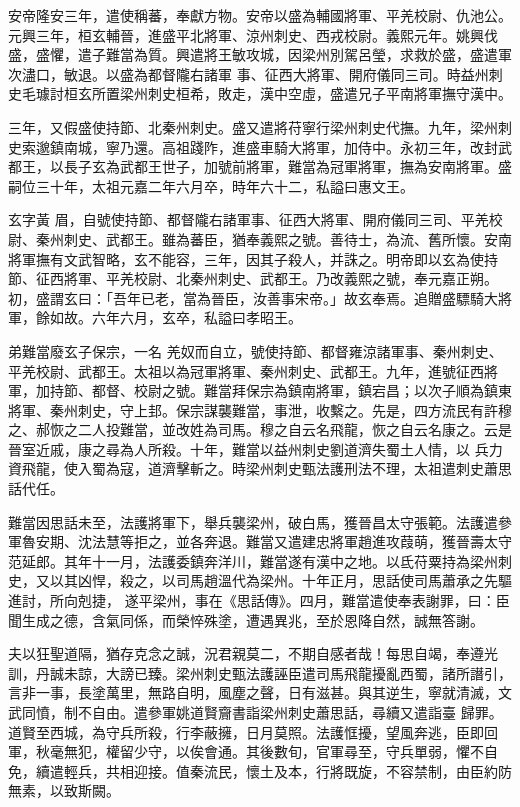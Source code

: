 \begin{pinyinscope}
 安帝隆安三年，遣使稱蕃，奉獻方物。安帝以盛為輔國將軍、平羌校尉、仇池公。元興三年，桓玄輔晉，進盛平北將軍、涼州刺史、西戎校尉。義熙元年。姚興伐盛，盛懼，遣子難當為質。興遣將王敏攻城，因梁州別駕呂瑩，求救於盛，盛遣軍次濜口，敏退。以盛為都督隴右諸軍
 事、征西大將軍、開府儀同三司。時益州刺史毛璩討桓玄所置梁州刺史桓希，敗走，漢中空虛，盛遣兄子平南將軍撫守漢中。



 三年，又假盛使持節、北秦州刺史。盛又遣將苻寧行梁州刺史代撫。九年，梁州刺史索邈鎮南城，寧乃還。高祖踐阼，進盛車騎大將軍，加侍中。永初三年，改封武都王，以長子玄為武都王世子，加號前將軍，難當為冠軍將軍，撫為安南將軍。盛嗣位三十年，太祖元嘉二年六月卒，時年六十二，私謚曰惠文王。



 玄字黃
 眉，自號使持節、都督隴右諸軍事、征西大將軍、開府儀同三司、平羌校尉、秦州刺史、武都王。雖為蕃臣，猶奉義熙之號。善待士，為流、舊所懷。安南將軍撫有文武智略，玄不能容，三年，因其子殺人，并誅之。明帝即以玄為使持節、征西將軍、平羌校尉、北秦州刺史、武都王。乃改義熙之號，奉元嘉正朔。初，盛謂玄曰：「吾年已老，當為晉臣，汝善事宋帝。」故玄奉焉。追贈盛驃騎大將軍，餘如故。六年六月，玄卒，私謚曰孝昭王。



 弟難當廢玄子保宗，一名
 羌奴而自立，號使持節、都督雍涼諸軍事、秦州刺史、平羌校尉、武都王。太祖以為冠軍將軍、秦州刺史、武都王。九年，進號征西將軍，加持節、都督、校尉之號。難當拜保宗為鎮南將軍，鎮宕昌；以次子順為鎮東將軍、秦州刺史，守上邽。保宗謀襲難當，事泄，收繫之。先是，四方流民有許穆之、郝恢之二人投難當，並改姓為司馬。穆之自云名飛龍，恢之自云名康之。云是晉室近戚，康之尋為人所殺。十年，難當以益州刺史劉道濟失蜀土人情，以
 兵力資飛龍，使入蜀為寇，道濟擊斬之。時梁州刺史甄法護刑法不理，太祖遣刺史蕭思話代任。



 難當因思話未至，法護將軍下，舉兵襲梁州，破白馬，獲晉昌太守張範。法護遣參軍魯安期、沈法慧等拒之，並各奔退。難當又遣建忠將軍趙進攻葭萌，獲晉壽太守范延郎。其年十一月，法護委鎮奔洋川，難當遂有漢中之地。以氐苻粟持為梁州刺史，又以其凶悍，殺之，以司馬趙溫代為梁州。十年正月，思話使司馬蕭承之先驅進討，所向剋捷，
 遂平梁州，事在《思話傳》。四月，難當遣使奉表謝罪，曰：臣聞生成之德，含氣同係，而榮悴殊塗，遭遇異兆，至於恩降自然，誠無答謝。



 夫以狂聖道隔，猶存克念之誠，況君親莫二，不期自感者哉！每思自竭，奉遵光訓，丹誠未諒，大謗已臻。梁州刺史甄法護誣臣遣司馬飛龍擾亂西蜀，諸所譖引，言非一事，長塗萬里，無路自明，風塵之聲，日有滋甚。與其逆生，寧就清滅，文武同憤，制不自由。遣參軍姚道賢齎書詣梁州刺史蕭思話，尋續又遣詣臺
 歸罪。道賢至西城，為守兵所殺，行李蔽擁，日月莫照。法護恇擾，望風奔逃，臣即回軍，秋毫無犯，權留少守，以俟會通。其後數旬，官軍尋至，守兵單弱，懼不自免，續遣輕兵，共相迎接。值秦流民，懷土及本，行將既旋，不容禁制，由臣約防無素，以致斯闕。




\end{pinyinscope}
